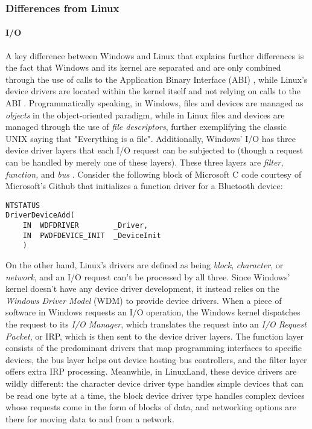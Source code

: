 \documentclass[letterpaper,10pt,titlepage]{article}
\begin{document}
% 
%
%

\subsubsection{Differences from Linux}
\paragraph{I/O}
A key difference between Windows and Linux that explains further differences is the fact that Windows and its kernel are separated and are only combined through the use of calls to the Application Binary Interface (ABI) \cite{windowsSys}, while Linux's device drivers are located within the kernel itself and not relying on calls to the ABI \cite{linux}. Programmatically speaking, in Windows, files and devices are managed as \emph{objects} in the object-oriented paradigm, while in Linux files and devices are managed through the use of \emph{file descriptors}, further exemplifying the classic UNIX saying that "Everything is a file". Additionally, Windows' I/O has three device driver layers that each I/O request can be subjected to (though a request can be handled by merely one of these layers). These three layers are \emph{filter, function,} and \emph{bus} \cite{windowsInt2}. Consider the following block of Microsoft C code courtesy of Microsoft's Github that initializes a function driver for a Bluetooth device:
\begin{lstlisting}
NTSTATUS
DriverDeviceAdd(
    IN  WDFDRIVER        _Driver,
    IN  PWDFDEVICE_INIT  _DeviceInit
    )
\end{lstlisting}
On the other hand, Linux's drivers are defined as being \emph{block}, \emph{character}, or \emph{network}, and an I/O request can't be processed by all three. Since Windows' kernel doesn't have any device driver development, it instead relies on the \emph{Windows Driver Model} (WDM) to provide device drivers. When a piece of software in Windows requests an I/O operation, the Windows kernel dispatches the request to its \emph{I/O Manager}, which translates the request into an \emph{I/O Request Packet}, or IRP, which is then sent to the device driver layers. The function layer consists of the predominant drivers that map programming interfaces to specific devices, the bus layer helps out device hosting bus controllers, and the filter layer offers extra IRP processing. Meanwhile, in LinuxLand, these device drivers are wildly different: the character device driver type handles simple devices that can be read one byte at a time, the block device driver type handles complex devices whose requests come in the form of blocks of data, and networking options are there for moving data to and from a network.         
\end{document}
